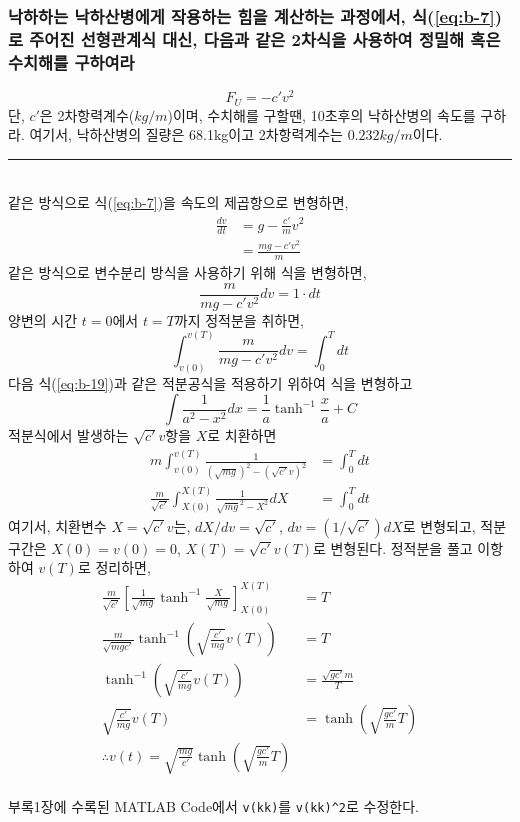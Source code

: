 \subsubsection{낙하하는 낙하산병에게 작용하는 힘을 계산하는 과정에서, 식(\ref{eq:b-7})로 주어진 선형관계식 대신, 다음과 같은 2차식을 사용하여 정밀해 혹은 수치해를 구하여라}

\begin{displaymath}
F_{U}=-c'v^2
\end{displaymath}
단, $c'$은 2차항력계수($kg/m$)이며, 수치해를 구할땐, 10초후의 낙하산병의 속도를 구하라. 여기서, 낙하산병의 질량은 68.1kg이고 2차항력계수는 $0.232kg/m$이다.\\
\rule{\textwidth}{0.1pt}
\\
같은 방식으로 식(\ref{eq:b-7})을 속도의 제곱항으로 변형하면,
\begin{align}
\frac{dv}{dt}&=g-\frac{c'}{m}v^2\\
&=\frac{mg-c'v^2}{m}
\end{align}
같은 방식으로 변수분리 방식을 사용하기 위해 식을 변형하면,
\begin{equation}
\frac{m}{mg-c'v^2}dv=1\cdot dt
\end{equation}
양변의 시간 $t=0$에서 $t=T$까지 정적분을 취하면,
\begin{equation}
\int_{v(0)}^{v(T)}\frac{m}{mg-c'v^2}dv=\int_{0}^{T}dt
\end{equation}
다음 식(\ref{eq:b-19})과 같은 적분공식을 적용하기 위하여 식을 변형하고
\begin{equation}
\int\frac{1}{a^2-x^2}dx=\frac{1}{a}\tanh^{-1}\frac{x}{a}+C
\label{eq:b-19}
\end{equation}
적분식에서 발생하는 $\sqrt{c'}v$항을 $X$로 치환하면
\begin{align}
m\int_{v(0)}^{v(T)}\frac{1}{(\sqrt{mg})^2-(\sqrt{c'}v)^2}&=\int_{0}^{T}dt\\
\frac{m}{\sqrt{c'}}\int_{X(0)}^{X(T)}\frac{1}{\sqrt{mg}^2-X^2}dX&=\int_{0}^{T}dt
\end{align}
여기서, 치환변수 $X=\sqrt{c'}v$는, $dX/dv=\sqrt{c'}$, $dv=(1/\sqrt{c'})dX$로 변형되고, 적분구간은 $X(0)=v(0)=0$, $X(T)=\sqrt{c'}v(T)$로 변형된다. 정적분을 풀고 이항하여 $v(T)$로 정리하면,
\begin{align}
\frac{m}{\sqrt{c'}}\left[\frac{1}{\sqrt{mg}}\tanh^{-1}\frac{X}{\sqrt{mg}}\right]_{X(0)}^{X(T)}&=T\\
\frac{m}{\sqrt{mgc'}}\tanh^{-1}\left(\sqrt{\frac{c'}{mg}}v(T)\right)&=T\\
\tanh^{-1}\left(\sqrt{\frac{c'}{mg}}v(T)\right)&=\frac{\sqrt{gc'}{m}}T\\
\sqrt{\frac{c'}{mg}}v(T)&=\tanh\left(\sqrt{\frac{gc'}{m}}T\right)\\
\therefore v(t)=\sqrt{\frac{mg}{c'}}\tanh\left(\sqrt{\frac{gc'}{m}}T\right)
\end{align}
\\
부록1장에 수록된 MATLAB Code에서 \texttt{v(kk)}를 \texttt{v(kk)\^{}2}로 수정한다.


